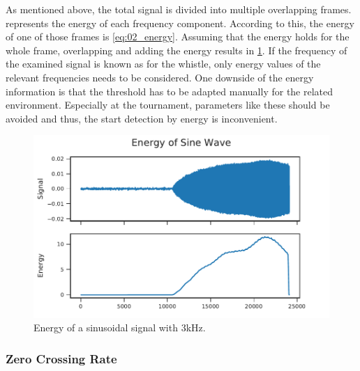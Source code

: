 As mentioned above, the total signal is divided into multiple overlapping frames.
 represents the energy of each frequency
component.
According to this, the energy of one of those frames is \cref{eq:02_energy}.
Assuming that the energy holds for the whole frame, overlapping and adding the energy
results in \cref{fig:03_energy}.
If the frequency of the examined signal is known as for the whistle, only energy values
of the relevant frequencies needs to be considered.
One downside of the energy information is that the threshold has to be adapted
manually for the related environment.
Especially at the tournament, parameters like these should be avoided and thus,
the start detection by energy is inconvenient.
\begin{figure}[ht]
	\centering
		\includegraphics[]{figures/sine_energy}
	\caption{Energy of a sinusoidal signal with 3\si{\kilo\hertz}.}
	\label{fig:03_energy}
\end{figure}

\subsubsection*{Zero Crossing Rate}


